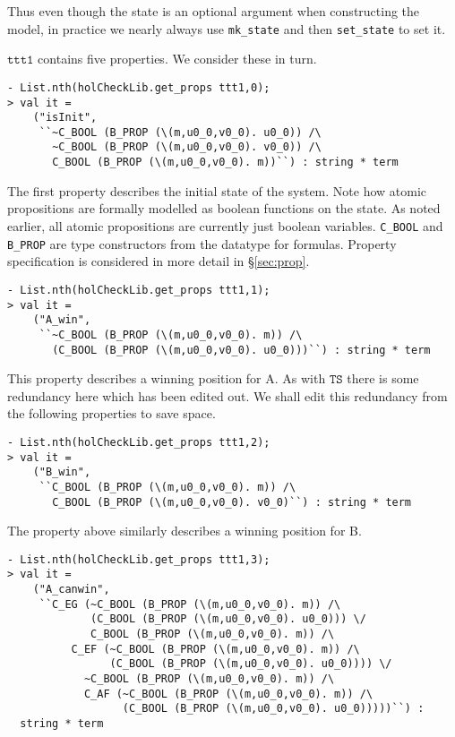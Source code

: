 Thus even though the state is an optional argument when constructing the model, in practice we nearly always use \texttt{mk\_state} and then \texttt{set\_state} to set it.

\(\mathtt{ttt1}\) contains five \ctl properties. We consider these in turn.

\begin{session}
\begin{verbatim}
- List.nth(holCheckLib.get_props ttt1,0);
> val it =
    ("isInit",
     ``~C_BOOL (B_PROP (\(m,u0_0,v0_0). u0_0)) /\
       ~C_BOOL (B_PROP (\(m,u0_0,v0_0). v0_0)) /\
       C_BOOL (B_PROP (\(m,u0_0,v0_0). m))``) : string * term
\end{verbatim}
\end{session}

The first property describes the initial state of the system. Note how atomic propositions are formally modelled as boolean functions on the state. As noted earlier, all atomic propositions are currently just boolean variables. \texttt{C\_BOOL} and \texttt{B\_PROP} are type constructors from the \HOL{} datatype for \ctl formulas. Property specification is considered in more detail in \S\ref{sec:prop}.

\begin{session}
\begin{verbatim}
- List.nth(holCheckLib.get_props ttt1,1);
> val it =
    ("A_win",
     ``~C_BOOL (B_PROP (\(m,u0_0,v0_0). m)) /\
       (C_BOOL (B_PROP (\(m,u0_0,v0_0). u0_0)))``) : string * term
\end{verbatim}
\end{session}

This property describes a winning position for A. As with \(\mathtt{TS}\) there is some redundancy here which has been edited out. We shall edit this redundancy from the following properties to save space.

\begin{session}
\begin{verbatim}
- List.nth(holCheckLib.get_props ttt1,2);
> val it =
    ("B_win",
     ``C_BOOL (B_PROP (\(m,u0_0,v0_0). m)) /\
       C_BOOL (B_PROP (\(m,u0_0,v0_0). v0_0)``) : string * term
\end{verbatim}
\end{session}

The property above similarly describes a winning position for B.

\begin{session}\begin{verbatim}
- List.nth(holCheckLib.get_props ttt1,3);
> val it =
    ("A_canwin",
     ``C_EG (~C_BOOL (B_PROP (\(m,u0_0,v0_0). m)) /\
             (C_BOOL (B_PROP (\(m,u0_0,v0_0). u0_0))) \/
             C_BOOL (B_PROP (\(m,u0_0,v0_0). m)) /\
          C_EF (~C_BOOL (B_PROP (\(m,u0_0,v0_0). m)) /\
                (C_BOOL (B_PROP (\(m,u0_0,v0_0). u0_0)))) \/
            ~C_BOOL (B_PROP (\(m,u0_0,v0_0). m)) /\
            C_AF (~C_BOOL (B_PROP (\(m,u0_0,v0_0). m)) /\
                  (C_BOOL (B_PROP (\(m,u0_0,v0_0). u0_0)))))``) :
  string * term
\end{verbatim}\end{session}

